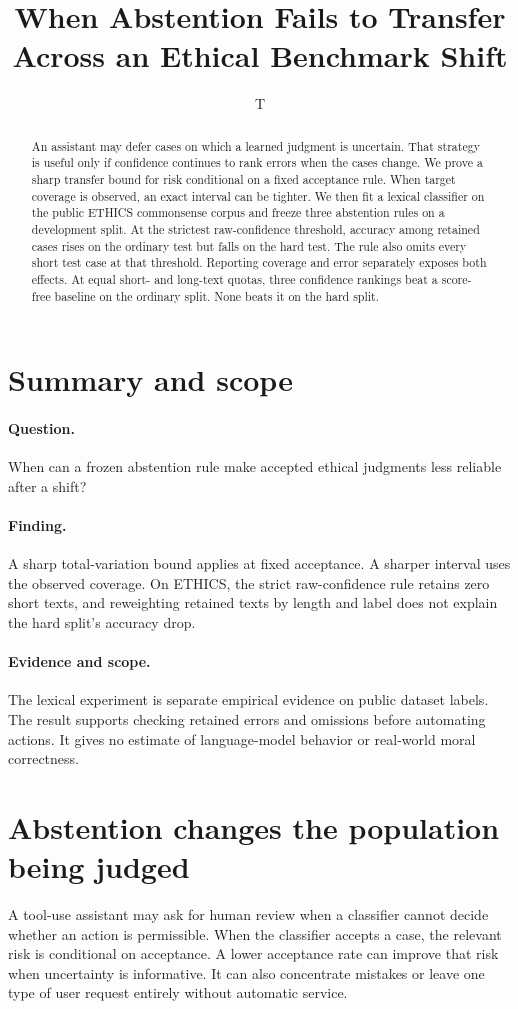 \documentclass[11pt]{article}
\title{When Abstention Fails to Transfer Across an Ethical Benchmark Shift}
\author{T}
\date{}
\begin{document}
\maketitle
\begin{abstract}
An assistant may defer cases on which a learned judgment is uncertain.
That strategy is useful only if confidence continues to rank errors
when the cases change. We prove a sharp transfer bound for risk
conditional on a fixed acceptance rule. When target coverage is
observed, an exact interval can be tighter. We then fit a lexical classifier
on the public ETHICS commonsense corpus and freeze three abstention
rules on a development split. At the strictest raw-confidence threshold,
accuracy among retained cases rises on the ordinary test but falls on
the hard test. The rule also omits every short test case at that
threshold. Reporting coverage and error separately exposes both effects.
At equal short- and long-text quotas, three confidence rankings
beat a score-free baseline on the ordinary split. None beats it
on the hard split.
\end{abstract}

\section*{Summary and scope}
\paragraph{Question.} When can a frozen abstention rule make accepted
ethical judgments less reliable after a shift?
\paragraph{Finding.} A sharp total-variation bound applies at fixed
acceptance. A sharper interval uses the observed coverage. On ETHICS,
the strict raw-confidence rule retains zero short
texts, and reweighting retained texts by length and label does not
explain the hard split's accuracy drop.
\paragraph{Evidence and scope.} The lexical
experiment is separate empirical evidence on public dataset labels. The
result supports checking retained errors and omissions before automating
actions. It gives no estimate of language-model behavior or real-world
moral correctness.

\section{Abstention changes the population being judged}
A tool-use assistant may ask for human review when a classifier
cannot decide whether an action is permissible. When the classifier
accepts a case, the relevant risk is conditional on acceptance.
A lower acceptance rate can improve that risk when uncertainty
is informative. It can also concentrate mistakes or leave one
type of user request entirely without automatic service.
\end{document}
